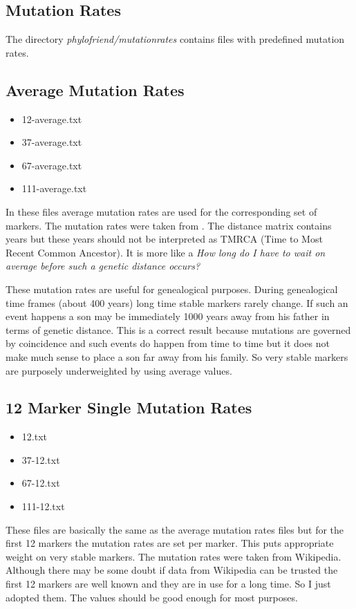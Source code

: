\subsection{Mutation Rates}

The directory \emph{phylofriend/mutationrates} contains
files with predefined mutation rates.


\subsection*{Average Mutation Rates}

\begin{itemize}
\item 12-average.txt
\item 37-average.txt
\item 67-average.txt
\item 111-average.txt
\end{itemize}

In these files average mutation rates are used for the
corresponding set of markers. The mutation rates were taken
from \cite{Kly12}. The distance matrix contains years but
these years should not be interpreted as TMRCA (Time to Most
Recent Common Ancestor). It is more like a \emph{How long
do I have to wait on average before such a genetic distance
occurs?}

These mutation rates are useful for genealogical purposes.
During genealogical time frames (about 400 years) long time
stable markers rarely change. If such an event happens a
son may be immediately 1000 years away from his father in
terms of genetic distance. This is a correct result because
mutations are governed by coincidence and such events do
happen from time to time but it does not make much sense
to place a son far away from his family. So very stable
markers are purposely underweighted by using average
values.


\subsection*{12 Marker Single Mutation Rates}

\begin{itemize}
\item 12.txt
\item 37-12.txt
\item 67-12.txt
\item 111-12.txt
\end{itemize}

These files are basically the same as the average mutation
rates files but for the first 12 markers the mutation rates
are set per marker. This puts appropriate weight on
very stable markers. The mutation rates were taken from
Wikipedia\cite{Wiki-List_of_DYS_markers}. Although there
may be some doubt if data from Wikipedia can be trusted 
the first 12 markers are well known and they are in use
for a long time. So I just adopted them. The values should be
good enough for most purposes.

